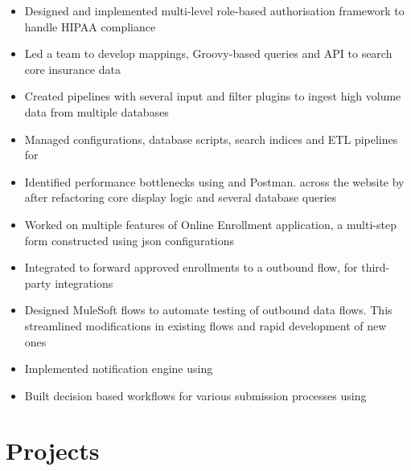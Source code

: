 \documentclass[]{resume}
\begin{document}
\begin{minipage}[t]{0.66\textwidth}
\begin{itemize}
    \item Designed and implemented multi-level role-based authorisation framework to handle HIPAA compliance
    \item Led a team to develop  mappings, Groovy-based queries and  API to search core insurance data
    \item Created  pipelines with several input and filter plugins to ingest high volume data from multiple databases
    \item Managed configurations, database scripts, search indices and ETL pipelines for  
    \item Identified performance bottlenecks using  and Postman.  across the website by  after refactoring core display logic and several database queries
    \item Worked on multiple features of Online Enrollment application, a multi-step form constructed using json configurations 
    \item Integrated  to forward approved enrollments to a  outbound flow, for third-party integrations
    \item Designed MuleSoft flows to automate testing of outbound data flows. This streamlined modifications in existing flows and rapid development of new ones
    \item Implemented notification engine using 
    \item Built decision based workflows for various submission processes using 
\end{itemize}
\sectionsep



\section{Projects}


\end{minipage}
\end{document}
